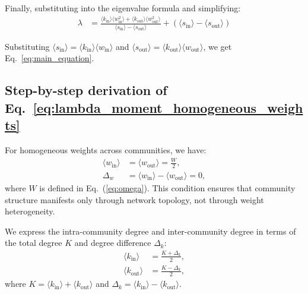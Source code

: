 \documentclass[a4paper,pre,superscriptaddress,floatfix,nofootinbib,twocolumn]{revtex4-1}
\begin{document}

Finally, substituting into the eigenvalue formula and simplifying:
\begin{align*}
\lambda &= \frac{\langle k_{\text{in}} \rangle \langle w^2_\text{in} \rangle + \langle k_{\text{out}} \rangle \langle w^2_\text{out} \rangle}{\langle s_\text{in} \rangle - \langle s_\text{out} \rangle} + (\langle s_\text{in} \rangle - \langle s_\text{out} \rangle)
\end{align*}

Substituting $\langle s_\text{in} \rangle = \langle k_{\text{in}} \rangle \langle w_\text{in} \rangle$ and $\langle s_\text{out} \rangle = \langle k_{\text{out}} \rangle \langle w_\text{out} \rangle$, we get Eq.~\eqref{eq:main_equation}.




\subsection*{Step-by-step derivation of Eq.~\eqref{eq:lambda_moment_homogeneous_weights}}
\label{sec:derivation_of_lambda}
\label{sec:detailed_derivation_homogeneous}

For homogeneous weights across communities, we have:
\begin{align*}
\langle w_\text{in} \rangle &= \langle w_\text{out} \rangle = \frac{W}{2},\\
\Delta_{w} &= \langle w_\text{in} \rangle - \langle w_\text{out} \rangle = 0,
\end{align*}
where $W$ is defined in Eq.~(\ref{eq:omega}). This condition ensures that community structure manifests only through network topology, not through weight heterogeneity.

We express the intra-community degree and inter-community degree in terms of the total degree $K$ and degree difference $\Delta_k$:
\begin{align*}
\langle k_{\text{in}} \rangle &= \frac{K + \Delta_k}{2},\\
\langle k_{\text{out}} \rangle &= \frac{K - \Delta_k}{2},
\end{align*}
where $K = \langle k_{\text{in}} \rangle + \langle k_{\text{out}} \rangle$ and $\Delta_k = \langle k_{\text{in}} \rangle - \langle k_{\text{out}} \rangle$.
\end{document}
